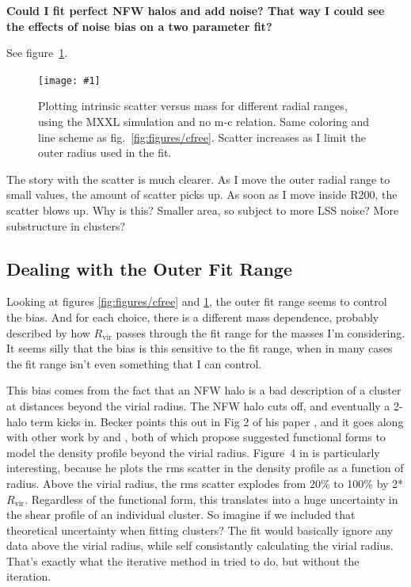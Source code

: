 \documentclass[11pt]{article}
\newcommand{\logfig}[2]{
See figure~\ref{fig:#1}.
\begin{figure}[!ht] 
\texttt{[image: \#1]} 
\caption{#2} 
\label{fig:#1} 
\end{figure}
}
\begin{document}
\textbf{Could I fit perfect NFW halos and add noise? That way I could see the effects of noise bias on a two parameter fit?}


\logfig{figures/cfree_scatter}{Plotting intrinsic scatter versus mass for different radial ranges, using the MXXL simulation and no m-c relation. Same coloring and line scheme as fig.~\ref{fig:figures/cfree}. Scatter increases as I limit the outer radius used in the fit.}

The story with the scatter is much clearer. As I move the outer radial range to small values, the amount of scatter picks up. As soon as I move inside R200, the scatter blows up. Why is this? Smaller area, so subject to more LSS noise? More substructure in clusters?


\subsection{Dealing with the Outer Fit Range}
\label{sec:outerfitrange}

Looking at figures \ref{fig:figures/cfree} and \ref{fig:figures/cfree_scatter}, the outer fit range seems to control the bias. And for each choice, there is a different mass dependence, probably described by how $R_{\mathrm{vir}}$ passes through the fit range for the masses I'm considering. It seems silly that the bias is this sensitive to the fit range, when in many cases the fit range isn't even something that I can control.

This bias comes from the fact that an NFW halo is a bad description of a cluster at distances beyond the virial radius. The NFW halo cuts off, and eventually a 2-halo term kicks in. Becker points this out in Fig 2 of his paper \citep{becker11}, and it goes along with other work by \citet{oguri_profiles} and \citet{tavio_profiles}, both of which propose suggested functional forms to model the density profile beyond the virial radius. Figure~4 in \citet{tavio_profiles} is particularly interesting, because he plots the rms scatter in the density profile as a function of radius. Above the virial radius, the rms scatter explodes from 20\% to 100\% by 2*$R_{\mathrm{vir}}$. Regardless of the functional form, this translates into a huge uncertainty in the shear profile of an individual cluster. So imagine if we included that theoretical uncertainty when fitting clusters? The fit would basically ignore any data above the virial radius, while self consistantly calculating the virial radius. That's exactly what the iterative method in \citet{becker11} tried to do, but without the iteration.
\end{document}
